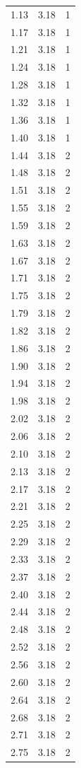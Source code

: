 \begin{longtable}{lrr}
  1.13 & 3.18 & 1 \\
  1.17 & 3.18 & 1 \\
  1.21 & 3.18 & 1 \\
  1.24 & 3.18 & 1 \\
  1.28 & 3.18 & 1 \\
  1.32 & 3.18 & 1 \\
  1.36 & 3.18 & 1 \\
  1.40 & 3.18 & 1 \\
  1.44 & 3.18 & 2 \\
  1.48 & 3.18 & 2 \\
  1.51 & 3.18 & 2 \\
  1.55 & 3.18 & 2 \\
  1.59 & 3.18 & 2 \\
  1.63 & 3.18 & 2 \\
  1.67 & 3.18 & 2 \\
  1.71 & 3.18 & 2 \\
  1.75 & 3.18 & 2 \\
  1.79 & 3.18 & 2 \\
  1.82 & 3.18 & 2 \\
  1.86 & 3.18 & 2 \\
  1.90 & 3.18 & 2 \\
  1.94 & 3.18 & 2 \\
  1.98 & 3.18 & 2 \\
  2.02 & 3.18 & 2 \\
  2.06 & 3.18 & 2 \\
  2.10 & 3.18 & 2 \\
  2.13 & 3.18 & 2 \\
  2.17 & 3.18 & 2 \\
  2.21 & 3.18 & 2 \\
  2.25 & 3.18 & 2 \\
  2.29 & 3.18 & 2 \\
  2.33 & 3.18 & 2 \\
  2.37 & 3.18 & 2 \\
  2.40 & 3.18 & 2 \\
  2.44 & 3.18 & 2 \\
  2.48 & 3.18 & 2 \\
  2.52 & 3.18 & 2 \\
  2.56 & 3.18 & 2 \\
  2.60 & 3.18 & 2 \\
  2.64 & 3.18 & 2 \\
  2.68 & 3.18 & 2 \\
  2.71 & 3.18 & 2 \\
  2.75 & 3.18 & 2 \\

\end{longtable}
